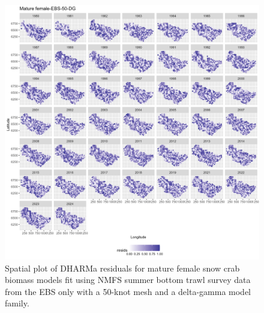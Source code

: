 \documentclass[
]{article}
\begin{document}
\begin{figure}

{\centering \includegraphics[width=1\linewidth,height=1\textheight]{../SNOW/Figures/DHARMa_Mature female-EBS-50-DG_SPATIAL} 

}

\caption{Spatial plot of DHARMa residuals for mature female snow crab biomass models fit using NMFS summer bottom trawl survey data from the EBS only with a 50-knot mesh and a delta-gamma model family.}\label{fig:snow-DHARMa-spat-50-matfem-EBS}
\end{figure}
\end{document}
